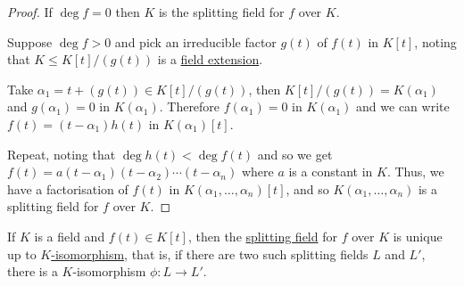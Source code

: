 \documentclass{article}
\begin{document}
\begin{proof}
    If $\deg f = 0$ then $K$ is the splitting field for $f$ over $K$.

    Suppose $\deg f > 0$ and pick an irreducible factor $g(t)$ of $f(t)$ in $K[t]$, noting that $K \leq K[t] / (g(t))$ is a \hyperlink{def:fieldExt}{field extension}.

    Take $\alpha_1 = t + (g(t)) \in K[t]/(g(t))$, then $K[t]/(g(t)) = K(\alpha_1)$ and $g(\alpha_1) = 0$ in $K(\alpha_1)$.
    Therefore $f(\alpha_1) = 0$ in $K(\alpha_1)$ and we can write $f(t) = (t-\alpha_1) h(t)$ in $K(\alpha_1)[t]$.

    Repeat, noting that $\deg h(t) < \deg f(t)$ and so we get $f(t) = a(t - \alpha_1)(t - \alpha_2) \dotsm (t-\alpha_n)$ where $a$ is a constant in $K$.
    Thus, we have a factorisation of $f(t)$ in $K(\alpha_1, \dotsc, \alpha_n)[t]$, and so $K(\alpha_1, \dotsc, \alpha_n)$ is a splitting field for $f$ over $K$.
\end{proof}

\begin{nthm}\label{thm:splittingFieldUniqueness}
    If $K$ is a field and $f(t) \in K[t]$, then the \hyperlink{def:splitting}{splitting field} for $f$ over $K$ is unique up to \hyperlink{not:hom}{$K$-isomorphism}, that is, if there are two such splitting fields $L$ and $L'$, there is a $K$-isomorphism $\phi: L \to L'$.
\end{nthm}
\end{document}
